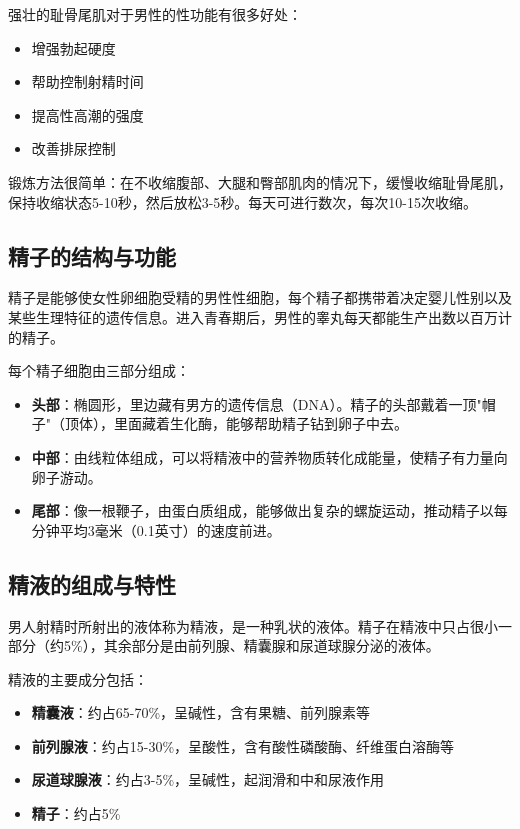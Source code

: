 强壮的耻骨尾肌对于男性的性功能有很多好处：
\begin{itemize}
    \item 增强勃起硬度
    \item 帮助控制射精时间
    \item 提高性高潮的强度
    \item 改善排尿控制
\end{itemize}

锻炼方法很简单：在不收缩腹部、大腿和臀部肌肉的情况下，缓慢收缩耻骨尾肌，保持收缩状态5-10秒，然后放松3-5秒。每天可进行数次，每次10-15次收缩。

\subsection{精子的结构与功能}

精子是能够使女性卵细胞受精的男性性细胞，每个精子都携带着决定婴儿性别以及某些生理特征的遗传信息。进入青春期后，男性的睾丸每天都能生产出数以百万计的精子。

每个精子细胞由三部分组成：

\begin{itemize}
    \item \textbf{头部}：椭圆形，里边藏有男方的遗传信息（DNA）。精子的头部戴着一顶"帽子"（顶体），里面藏着生化酶，能够帮助精子钻到卵子中去。
    \item \textbf{中部}：由线粒体组成，可以将精液中的营养物质转化成能量，使精子有力量向卵子游动。
    \item \textbf{尾部}：像一根鞭子，由蛋白质组成，能够做出复杂的螺旋运动，推动精子以每分钟平均3毫米（0.1英寸）的速度前进。
\end{itemize}

\subsection{精液的组成与特性}

男人射精时所射出的液体称为精液，是一种乳状的液体。精子在精液中只占很小一部分（约5\%），其余部分是由前列腺、精囊腺和尿道球腺分泌的液体。

精液的主要成分包括：
\begin{itemize}
    \item \textbf{精囊液}：约占65-70\%，呈碱性，含有果糖、前列腺素等
    \item \textbf{前列腺液}：约占15-30\%，呈酸性，含有酸性磷酸酶、纤维蛋白溶酶等
    \item \textbf{尿道球腺液}：约占3-5\%，呈碱性，起润滑和中和尿液作用
    \item \textbf{精子}：约占5\%
\end{itemize}

